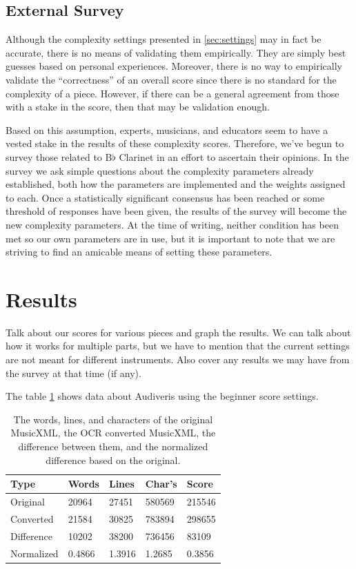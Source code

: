 \documentclass[10pt,preprint]{sigplanconf}
\begin{document}
{\subsection{External Survey} 
\label{sec:survey}

Although the complexity settings presented in \ref{sec:settings} may in fact be accurate, there is no means of validating them empirically. They are simply best guesses based on personal experiences. Moreover, there is no way to empirically validate the ``correctness'' of an overall score since there is no standard for the complexity of a piece. However, if there can be a general agreement from those with a stake in the score, then that may be validation enough.

Based on this assumption, experts, musicians, and educators seem to have a vested stake in the results of these complexity scores. Therefore, we've begun to survey those related to B$\flat$ Clarinet in an effort to ascertain their opinions. In the survey we ask simple questions about the complexity parameters already established, both how the parameters are implemented and the weights assigned to each. Once a statistically significant consensus has been reached or some threshold of responses have been given, the results of the survey will become the new complexity parameters. At the time of writing, neither condition has been met so our own parameters are in use, but it is important to note that we are striving to find an amicable means of setting these parameters.

\section{Results} 
\label{sec:results}

Talk about our scores for various pieces and graph the results. We can talk about how it works for multiple parts, but we have to mention that the current settings are not meant for different instruments. Also cover any results we may have from the survey at that time (if any).

The table \ref{table:difference} shows data about Audiveris using the beginner score settings.

\begin{table}[ht!]
	\centering
    \begin{tabular}{| l | l | l | l | l |}
        \hline
        Type & Words & Lines & Char's & Score \\ \hline
        Original & 20964 & 27451 & 580569 & 215546 \\ \hline
        Converted & 21584 & 30825 & 783894 & 298655 \\ \hline
        Difference & 10202 & 38200 & 736456 & 83109 \\ \hline
        Normalized & 0.4866 & 1.3916 & 1.2685 & 0.3856 \\
        \hline
    \end{tabular}
	\caption{The words, lines, and characters of the original MusicXML, the OCR converted MusicXML, the difference between them, and the normalized difference based on the original.}
	\label{table:difference}
\end{table}

}
\end{document}
